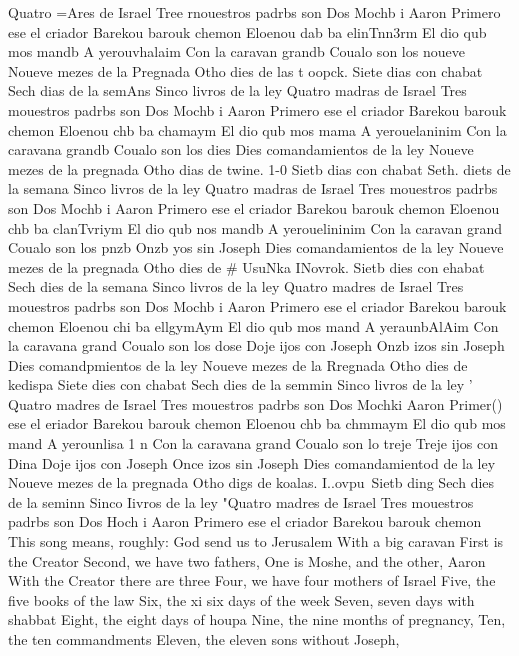 {Quatro =Ares de Israel 
Tree rnouestros padrbs son 
Dos Mochb i Aaron 
Primero ese el criador 
Barekou barouk chemon 
Eloenou dab ba elinTnn3rm 
El dio qub mos mandb 
A yerouvhalaim 
Con la caravan grandb 
Coualo son los noueve 
Noueve mezes de la Pregnada 
Otho dies de las t oopck. 
Siete dias con chabat 
Sech dias de la semAns 
Sinco livros de la ley 
Quatro madras de Israel 
Tres mouestros padrbs son 
Dos Mochb i Aaron 
Primero ese el criador 
Barekou barouk chemon 
Eloenou chb ba chamaym 
El dio qub mos mama 
A yerouelaninim 
Con la caravana grandb 
Coualo son los dies 
Dies comandamientos de la ley 
Noueve mezes de la pregnada 
Otho dias de twine. 1-0 %
Sietb dias con chabat 
Seth. diets de la semana 
Sinco livros de la ley 
Quatro madras de Israel 
Tres mouestros padrbs son 
Dos Mochb i Aaron 
Primero ese el criador 
Barekou barouk chemon 
Eloenou chb ba clanTvriym 
El dio qub nos mandb 
A yerouelininim 
Con la caravan grand 
Coualo son los pnzb 
Onzb yos sin Joseph 
Dies comandamientos de la ley 
Noueve mezes de la pregnada 
Otho dies de # UsuNka INovrok. 
Sietb dies con ehabat 
Sech dies de la semana 
Sinco livros de la ley 
Quatro madres de Israel 
Tres mouestros padrbs son 
Dos Mochb i Aaron 
Primero ese el criador 
Barekou barouk chemon 
Eloenou chi ba ellgymAym 
El dio qub mos mand 
A yeraunbAlAim 
Con la caravana grand 
Coualo son los dose 
Doje ijos con Joseph 
Onzb izos sin Joseph 
Dies comandpmientos de la ley 
Noueve mezes de la Rregnada 
Otho dies de kedispa 
Siete dies con chabat 
Sech dies de la semmin 
Sinco livros de la ley ' 
Quatro madres de Israel 
Tres mouestros padrbs son 
Dos Mochki Aaron 
Primer() ese el eriador 
Barekou barouk chemon 
Eloenou chb ba chmmaym 
El dio qub mos mand 
A yerounlisa 1 n 
Con la caravana grand 
Coualo son lo treje 
Treje ijos con Dina 
Doje ijos con Joseph 
Once izos sin Joseph 
Dies comandamientod de la ley 
Noueve mezes de la pregnada 
Otho digs de koalas. I..ovpu\ 
Sietb ding%
Sech dies de la seminn 
Sinco Iivros de la ley 
"Quatro madres de Israel 
Tres mouestros padrbs son 
Dos Hoch i Aaron 
Primero ese el criador 
Barekou barouk chemon 
This song means, roughly: 
God send us to Jerusalem 
With a big caravan 
First is the Creator 
Second, we have two fathers, 
One is Moshe, and the other, Aaron 
With the Creator there are three 
Four, we have four mothers of Israel 
Five, the five books of the law 
Six, the xi six days of the week 
Seven, seven days with shabbat 
Eight, the eight days of houpa 
Nine, the nine months of pregnancy, 
Ten, the ten commandments 
Eleven, the eleven sons without Joseph, 
}

